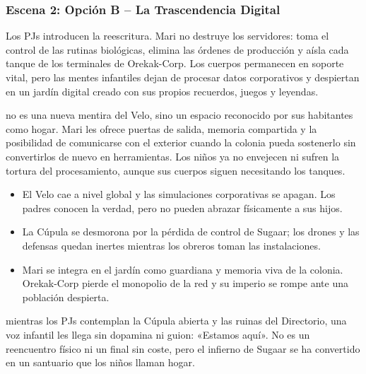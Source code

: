 \subsubsection{Escena 2: Opción B -- La Trascendencia Digital}
Los PJs introducen la reescritura. Mari no destruye los servidores: toma el control de las rutinas biológicas, elimina las órdenes de producción y aísla cada tanque de los terminales de Orekak-Corp. Los cuerpos permanecen en soporte vital, pero las mentes infantiles dejan de procesar datos corporativos y despiertan en un jardín digital creado con sus propios recuerdos, juegos y leyendas.\par
{} no es una nueva mentira del Velo, sino un espacio reconocido por sus habitantes como hogar. Mari les ofrece puertas de salida, memoria compartida y la posibilidad de comunicarse con el exterior cuando la colonia pueda sostenerlo sin convertirlos de nuevo en herramientas. Los niños ya no envejecen ni sufren la tortura del procesamiento, aunque sus cuerpos siguen necesitando los tanques.\par
{}
\begin{itemize}
  \item El Velo cae a nivel global y las simulaciones corporativas se apagan. Los padres conocen la verdad, pero no pueden abrazar físicamente a sus hijos.
  \item La Cúpula se desmorona por la pérdida de control de Sugaar; los drones y las defensas quedan inertes mientras los obreros toman las instalaciones.
  \item Mari se integra en el jardín como guardiana y memoria viva de la colonia. Orekak-Corp pierde el monopolio de la red y su imperio se rompe ante una población despierta.
\end{itemize}
 mientras los PJs contemplan la Cúpula abierta y las ruinas del Directorio, una voz infantil les llega sin dopamina ni guion: «Estamos aquí». No es un reencuentro físico ni un final sin coste, pero el infierno de Sugaar se ha convertido en un santuario que los niños llaman hogar.
